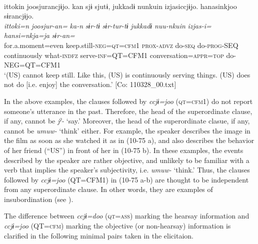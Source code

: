   \ex{}\\
      \glll    {\textbar}ittoki{\textbar}n  joosjurancjɨjo.  kan  sjɨ   sjutɨ,  jukkadɨ  nunkuin  izjasiccjɨjo. hanasinkjoo  sɨrancjɨjo.\\
      \textit{ittoki=n}  \textit{joosjur-an=}  \textit{ka-n}  \textit{sɨr-tɨ}  \textit{sɨr-tur-tɨ}  \textit{jukkadɨ}  \textit{nuu-nkuin}  \textit{izjas-i=} \textit{hansi=nkja=ja}  \textit{sɨr-an=}\\
      for.a.moment=even  keep.still-\textsc{neg}=\textsc{qt}=\textsc{cfm}1  \textsc{prox}-\textsc{advz}  do-\textsc{seq}  do-\textsc{prog}-SEQ  continuously  what-\textsc{indfz}  serve-\textsc{inf}=QT=CFM1   conversation=\textsc{appr}=\textsc{top}  do-NEG=QT=CFM1\\
      \glt ‘(US) cannot keep still. Like this, (US) is continuously serving things. (US) does not do [i.e. enjoy] the conversation.’   [Co: 110328\_00.txt]
    \z
\z

In the above examples, the clauses followed by \textit{ccjɨ=joo} (\textsc{qt}=\textsc{cfm}1) do not report someone’s utterance in the past. Therefore, the head of the superordinate clause, if any, cannot be \textit{jˀ-} ‘say.’ Moreover, the head of the superordinate clasue, if any, cannot be \textit{umuw-} ‘think’ either. For example, the speaker describes the image in the film as soon as she watched it as in (10-75 a), and also describes the behavior of her friend (“US”) in front of her in (10-75 b). In these examples, the events described by the speaker are rather objective, and unlikely to be familiar with a verb that implies the speaker’s subjectivity, i.e. \textit{umuw-} ‘think.’ Thus, the clauses followed by \textit{ccjɨ=joo} (QT=CFM1) in (10-75 a-b) are thought to be independent from any superordinate clause. In other words, they are examples of insubordination (see ).

  The difference between \textit{ccjɨ=doo} (\textsc{qt}=\textsc{ass}) marking the hearsay information and \textit{ccjɨ=joo} (QT=\textsc{cfm}) marking the objective (or non-hearsay) information is clarified in the following minimal pairs taken in the elicitaion.

